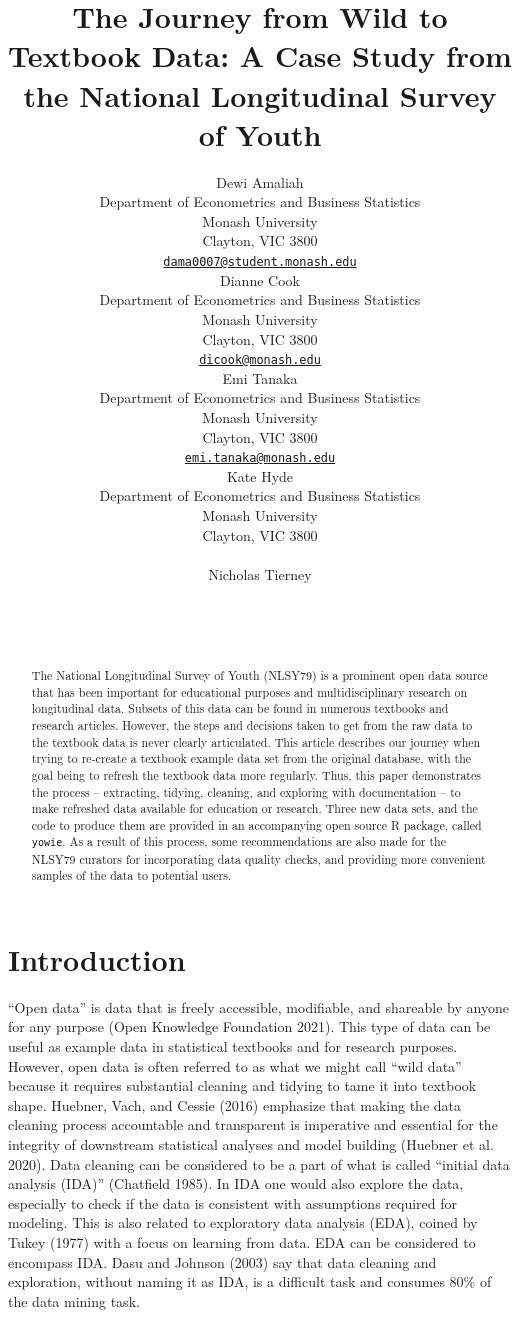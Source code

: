 \documentclass{article}
\title{The Journey from Wild to Textbook Data: A Case Study from the National Longitudinal Survey of Youth}
\author{
    Dewi Amaliah
   \\
    Department of Econometrics and Business Statistics \\
    Monash University \\
  Clayton, VIC 3800 \\
  \texttt{\href{mailto:dama0007@student.monash.edu}{\nolinkurl{dama0007@student.monash.edu}}} \\
   \And
    Dianne Cook
   \\
    Department of Econometrics and Business Statistics \\
    Monash University \\
  Clayton, VIC 3800 \\
  \texttt{\href{mailto:dicook@monash.edu}{\nolinkurl{dicook@monash.edu}}} \\
   \And
    Emi Tanaka
   \\
    Department of Econometrics and Business Statistics \\
    Monash University \\
  Clayton, VIC 3800 \\
  \texttt{\href{mailto:emi.tanaka@monash.edu}{\nolinkurl{emi.tanaka@monash.edu}}} \\
   \And
    Kate Hyde
   \\
    Department of Econometrics and Business Statistics \\
    Monash University \\
  Clayton, VIC 3800 \\
  \texttt{} \\
   \And
    Nicholas Tierney
   \\
     \\
   \\
  \texttt{} \\
  }
\begin{document}
\maketitle

\def\tightlist{}


\begin{abstract}
The National Longitudinal Survey of Youth (NLSY79) is a prominent open data source that has been important for educational purposes and multidisciplinary research on longitudinal data. Subsets of this data can be found in numerous textbooks and research articles. However, the steps and decisions taken to get from the raw data to the textbook data is never clearly articulated. This article describes our journey when trying to re-create a textbook example data set from the original database, with the goal being to refresh the textbook data more regularly. Thus, this paper demonstrates the process -- extracting, tidying, cleaning, and exploring with documentation -- to make refreshed data available for education or research. Three new data sets, and the code to produce them are provided in an accompanying open source R package, called \texttt{yowie}. As a result of this process, some recommendations are also made for the NLSY79 curators for incorporating data quality checks, and providing more convenient samples of the data to potential users.
\end{abstract}


\hypertarget{intro}{%
\section{Introduction}\label{intro}}

``Open data'' is data that is freely accessible, modifiable, and shareable by anyone for any purpose (Open Knowledge Foundation 2021). This type of data can be useful as example data in statistical textbooks and for research purposes. However, open data is often referred to as what we might call ``wild data'' because it requires substantial cleaning and tidying to tame it into textbook shape. Huebner, Vach, and Cessie (2016) emphasize that making the data cleaning process accountable and transparent is imperative and essential for the integrity of downstream statistical analyses and model building (Huebner et al. 2020).
Data cleaning can be considered to be a part of what is called ``initial data analysis (IDA)'' (Chatfield 1985). In IDA one would also explore the data, especially to check if the data is consistent with assumptions required for modeling. This is also related to exploratory data analysis (EDA), coined by Tukey (1977) with a focus on learning from data. EDA can be considered to encompass IDA. Dasu and Johnson (2003) say that data cleaning and exploration, without naming it as IDA, is a difficult task and consumes 80\% of the data mining task.
\end{document}
